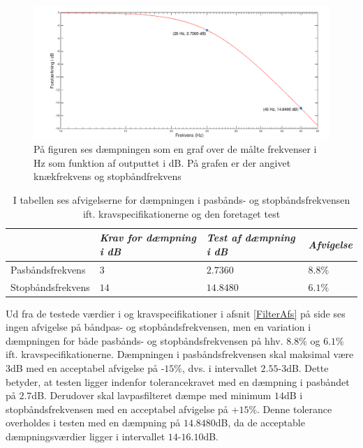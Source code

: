 \begin{figure}[H]
	\centering
	\includegraphics[scale=0.4]{figures/cProblemloesning/Lavpas_Matlab.PNG}
	\caption{På figuren ses dæmpningen som en graf over de målte frekvenser i Hz som funktion af outputtet i dB. På grafen er der angivet knækfrekvens og stopbåndfrekvens}
	\label{fig:Lavpas_Matlab}
\end{figure}

\begin{table}[H]
	\centering
	\begin{tabular}{|l|l|l|l|}
		\hline
		& \textit{Krav for dæmpning i dB} 	& \textit{Test af dæmpning i dB}  &\textit{Afvigelse} \\ \hline
		Pasbåndsfrekvens & $3$	& $2.7360$	    & $8.8\%$ \\ \hline
		Stopbåndsfrekvens & $14$    & $14.8480$    & $6.1\%$  \\ \hline
	\end{tabular}
	\caption{I tabellen ses afvigelserne for dæmpningen i pasbånds- og stopbåndsfrekvensen ift. kravspecifikationerne og den foretaget test}
	\label{Tab:Tolerance}
\end{table}
\noindent Ud fra de testede værdier i  og kravspecifikationer i afsnit \ref{FilterAfs} på side \pageref{FilterAfs} ses ingen afvigelse på båndpas- og stopbåndsfrekvensen, men en variation i dæmpningen for både pasbånds- og stopbåndsfrekvensen på hhv. $8.8\%$ og $6.1$\% ift. kravspecifikationerne. Dæmpningen i pasbåndsfrekvensen skal maksimal være $3$dB med en acceptabel afvigelse på -$15\%$, dvs. i intervallet $2.55$-$3$dB. Dette betyder, at testen ligger indenfor tolerancekravet med en dæmpning i pasbåndet på $2.7$dB. Derudover skal lavpasfilteret dæmpe med minimum $14$dB i stopbåndsfrekvensen med en acceptabel afvigelse på +$15\%$. Denne tolerance overholdes i testen med en dæmpning på $14.8480$dB, da de acceptable dæmpningsværdier ligger i intervallet $14$-$16.10$dB.\\

